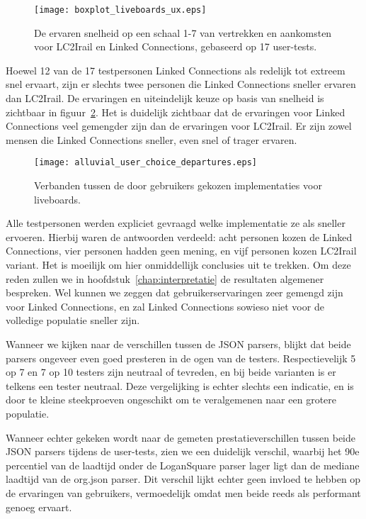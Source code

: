 \begin{figure}[h]
	\centering
	\texttt{[image: boxplot\_liveboards\_ux.eps]}
	\caption[Ervaren snelheid van liveboards]{De ervaren snelheid op een schaal 1-7 van vertrekken en aankomsten voor LC2Irail en Linked Connections, gebaseerd op 17 user-tests.}
	\label{fig:liveboardsUx}
\end{figure}

Hoewel 12 van de 17 testpersonen Linked Connections als redelijk tot extreem snel ervaart, zijn er slechts twee personen die Linked Connections sneller ervaren dan LC2Irail. De ervaringen en uiteindelijk keuze op basis van snelheid is zichtbaar in figuur~\ref{fig:alluvialUserChoicesLiveboards}. Het is duidelijk zichtbaar dat de ervaringen voor Linked Connections veel gemengder zijn dan de ervaringen voor LC2Irail. Er zijn zowel mensen die Linked Connections sneller, even snel of trager ervaren. 

\begin{figure}[ht]
	\centering
	\texttt{[image: alluvial\_user\_choice\_departures.eps]}
	\caption[Door gebruikers gekozen implementatie voor liveboards]{Verbanden tussen de door gebruikers gekozen implementaties voor liveboards. }
	\label{fig:alluvialUserChoicesLiveboards}
\end{figure}

Alle testpersonen werden expliciet gevraagd welke implementatie ze als sneller ervoeren. Hierbij waren de antwoorden verdeeld: acht personen kozen de Linked Connections, vier personen hadden geen mening, en vijf personen kozen LC2Irail variant. Het is moeilijk om hier onmiddellijk conclusies uit te trekken. Om deze reden zullen we in hoofdstuk~\ref{chap:interpretatie} de resultaten algemener bespreken. Wel kunnen we zeggen dat gebruikerservaringen zeer gemengd zijn voor Linked Connections, en zal Linked Connections sowieso niet voor de volledige populatie sneller zijn.

Wanneer we kijken naar de verschillen tussen de JSON parsers, blijkt dat beide parsers ongeveer even goed presteren in de ogen van de testers. Respectievelijk 5 op 7 en 7 op 10 testers zijn neutraal of tevreden, en bij beide varianten is er telkens een tester neutraal. Deze vergelijking is echter slechts een indicatie, en is door te kleine steekproeven ongeschikt om te veralgemenen naar een grotere populatie.

Wanneer echter gekeken wordt naar de gemeten prestatieverschillen tussen beide JSON parsers tijdens de user-tests, zien we een duidelijk verschil, waarbij het 90e percentiel van de laadtijd onder de LoganSquare parser lager ligt dan de mediane laadtijd van de org.json parser. Dit verschil lijkt echter geen invloed te hebben op de ervaringen van gebruikers, vermoedelijk omdat men beide reeds als performant genoeg ervaart. %

